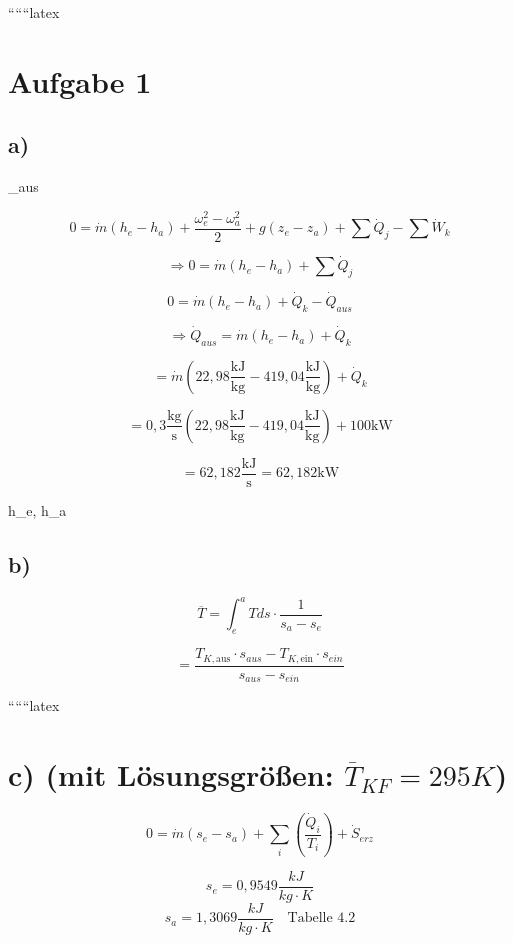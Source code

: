 
``````latex


\section*{Aufgabe 1}

\subsection*{a)}

 \quad {}_{aus}

\[
0 = \dot{m} (h_e - h_a) + \frac{\omega_e^2 - \omega_a^2}{2} + g(z_e - z_a) + \sum \dot{Q}_j - \sum \dot{W}_k
\]

\[
\Rightarrow 0 = \dot{m} (h_e - h_a) + \sum \dot{Q}_j
\]

\[
0 = \dot{m} (h_e - h_a) + \dot{Q}_k - \dot{Q}_{aus}
\]

\[
\Rightarrow \dot{Q}_{aus} = \dot{m} (h_e - h_a) + \dot{Q}_k
\]

\[
= \dot{m} (22,98 \frac{\text{kJ}}{\text{kg}} - 419,04 \frac{\text{kJ}}{\text{kg}}) + \dot{Q}_k
\]

\[
= 0,3 \frac{\text{kg}}{\text{s}} (22,98 \frac{\text{kJ}}{\text{kg}} - 419,04 \frac{\text{kJ}}{\text{kg}}) + 100 \text{kW}
\]

\[
= 62,182 \frac{\text{kJ}}{\text{s}} = 62,182 \text{kW}
\]

 h_e, h_a 

\subsection*{b)}

\[
\overline{T} = \int_{e}^{a} T ds \cdot \frac{1}{s_a - s_e}
\]

\[
= \frac{T_{K, \text{aus}} \cdot s_{aus} - T_{K, \text{ein}} \cdot s_{ein}}{s_{aus} - s_{ein}}
\]

``````latex


\section*{c) (mit Lösungsgrößen: $\overline{T}_{KF} = 295 K$)}

\[
0 = \dot{m}(s_e - s_a) + \sum_i \left( \frac{\dot{Q}_i}{T_i} \right) + \dot{S}_{erz}
\]

\[
s_e = 0{,}9549 \frac{kJ}{kg \cdot K}
\]
\[
s_a = 1{,}3069 \frac{kJ}{kg \cdot K} \quad \text{Tabelle 4.2}
\]

